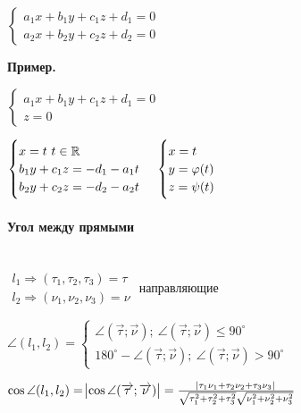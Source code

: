\documentclass{article}
\begin{document}
    \( \begin{cases}
        a_1x + b_1y + c_1z + d_1 = 0\\
        a_2x + b_2y + c_2z + d_2 = 0
    \end{cases} \)

    \textbf{Пример.} 

    \( \begin{cases}
        a_1x + b_1y + c_1z + d_1 = 0\\
        z = 0
    \end{cases} \)


    \(\begin{cases}
        x = t\ t \in \mathbb{R}\\
        b_1y + c_1z = -d_1 - a_1t\\
        b_2y + c_2z = -d_2 - a_2t
    \end{cases}\\
    \begin{cases}
        x = t\\
        y = \varphi(t)\\
        z = \psi(t)
    \end{cases}\)

    \paragraph{Угол между прямыми}\mbox{}\\

    \( \begin{array}{l}
        l_1 \Rightarrow (\tau_1, \tau_2, \tau_3) = \tau\\
        l_2 \Rightarrow (\nu_1, \nu_2, \nu_3) = \nu 
    \end{array} \) направляющие

    \(\angle(l_1, l_2) = \begin{cases}
        \angle(\overrightarrow{\tau}; \overrightarrow{\nu});\ \angle(\overrightarrow{\tau}; \overrightarrow{\nu}) \leq 90^\circ\\
        180^\circ - \angle(\overrightarrow{\tau}; \overrightarrow{\nu});\ \angle(\overrightarrow{\tau}; \overrightarrow{\nu}) > 90^\circ
    \end{cases}\)

    \( \cos\angle(l_1, l_2) = \abs{\cos\angle(\overrightarrow{\tau}; \overrightarrow{\nu})} = \frac{\abs{\tau_1\nu_1 + \tau_2\nu_2 + \tau_3\nu_3}}{\sqrt{\tau_1^2 + \tau_2^2 + \tau_3^2}\sqrt{\nu_1^2 + \nu_2^2 + \nu_3^2}} \)
\end{document}

